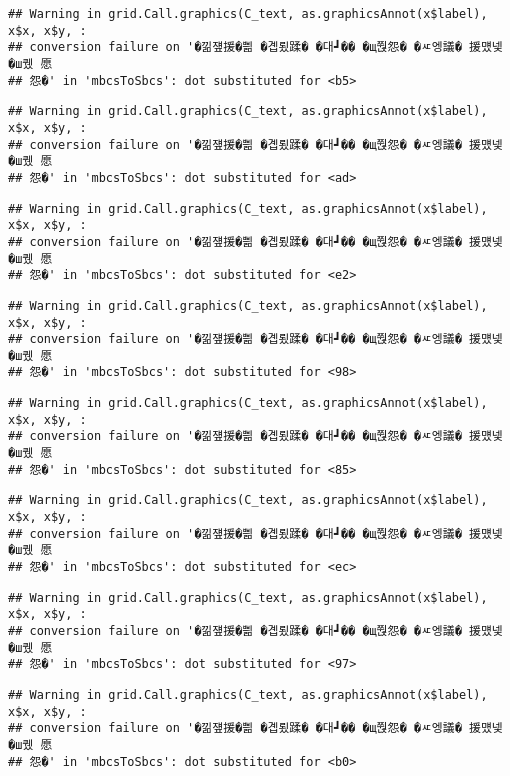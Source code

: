 \documentclass[
]{article}
\begin{document}
\begin{verbatim}
## Warning in grid.Call.graphics(C_text, as.graphicsAnnot(x$label), x$x, x$y, :
## conversion failure on '�낆쟾援�쁾 �곕룄蹂� �대┛�� �щ쭩怨� �ㅼ엥議� 援먰넻�ш퀬 愿
## 怨�' in 'mbcsToSbcs': dot substituted for <b5>
\end{verbatim}

\begin{verbatim}
## Warning in grid.Call.graphics(C_text, as.graphicsAnnot(x$label), x$x, x$y, :
## conversion failure on '�낆쟾援�쁾 �곕룄蹂� �대┛�� �щ쭩怨� �ㅼ엥議� 援먰넻�ш퀬 愿
## 怨�' in 'mbcsToSbcs': dot substituted for <ad>
\end{verbatim}

\begin{verbatim}
## Warning in grid.Call.graphics(C_text, as.graphicsAnnot(x$label), x$x, x$y, :
## conversion failure on '�낆쟾援�쁾 �곕룄蹂� �대┛�� �щ쭩怨� �ㅼ엥議� 援먰넻�ш퀬 愿
## 怨�' in 'mbcsToSbcs': dot substituted for <e2>
\end{verbatim}

\begin{verbatim}
## Warning in grid.Call.graphics(C_text, as.graphicsAnnot(x$label), x$x, x$y, :
## conversion failure on '�낆쟾援�쁾 �곕룄蹂� �대┛�� �щ쭩怨� �ㅼ엥議� 援먰넻�ш퀬 愿
## 怨�' in 'mbcsToSbcs': dot substituted for <98>
\end{verbatim}

\begin{verbatim}
## Warning in grid.Call.graphics(C_text, as.graphicsAnnot(x$label), x$x, x$y, :
## conversion failure on '�낆쟾援�쁾 �곕룄蹂� �대┛�� �щ쭩怨� �ㅼ엥議� 援먰넻�ш퀬 愿
## 怨�' in 'mbcsToSbcs': dot substituted for <85>
\end{verbatim}

\begin{verbatim}
## Warning in grid.Call.graphics(C_text, as.graphicsAnnot(x$label), x$x, x$y, :
## conversion failure on '�낆쟾援�쁾 �곕룄蹂� �대┛�� �щ쭩怨� �ㅼ엥議� 援먰넻�ш퀬 愿
## 怨�' in 'mbcsToSbcs': dot substituted for <ec>
\end{verbatim}

\begin{verbatim}
## Warning in grid.Call.graphics(C_text, as.graphicsAnnot(x$label), x$x, x$y, :
## conversion failure on '�낆쟾援�쁾 �곕룄蹂� �대┛�� �щ쭩怨� �ㅼ엥議� 援먰넻�ш퀬 愿
## 怨�' in 'mbcsToSbcs': dot substituted for <97>
\end{verbatim}

\begin{verbatim}
## Warning in grid.Call.graphics(C_text, as.graphicsAnnot(x$label), x$x, x$y, :
## conversion failure on '�낆쟾援�쁾 �곕룄蹂� �대┛�� �щ쭩怨� �ㅼ엥議� 援먰넻�ш퀬 愿
## 怨�' in 'mbcsToSbcs': dot substituted for <b0>
\end{verbatim}
\end{document}

